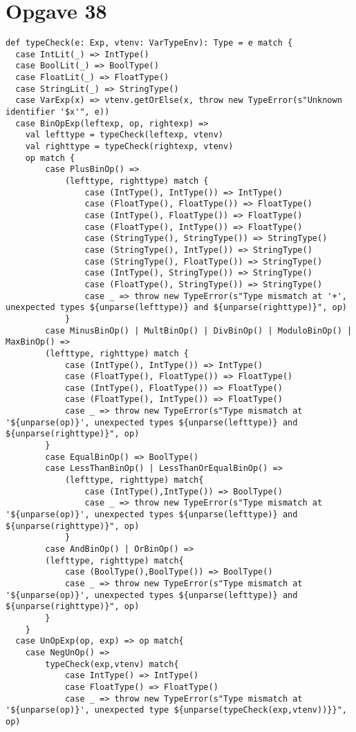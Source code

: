 \documentclass[a4paper, 10pt]{article}
\begin{document}
\section*{Opgave 38}
\begin{lstlisting}
def typeCheck(e: Exp, vtenv: VarTypeEnv): Type = e match {
  case IntLit(_) => IntType()
  case BoolLit(_) => BoolType()
  case FloatLit(_) => FloatType()
  case StringLit(_) => StringType()
  case VarExp(x) => vtenv.getOrElse(x, throw new TypeError(s"Unknown identifier '$x'", e))
  case BinOpExp(leftexp, op, rightexp) =>
  	val lefttype = typeCheck(leftexp, vtenv)
  	val righttype = typeCheck(rightexp, vtenv)
  	op match {
  		case PlusBinOp() =>
  			(lefttype, righttype) match {
  				case (IntType(), IntType()) => IntType()
  				case (FloatType(), FloatType()) => FloatType()
  				case (IntType(), FloatType()) => FloatType()
  				case (FloatType(), IntType()) => FloatType()
  				case (StringType(), StringType()) => StringType()
  				case (StringType(), IntType()) => StringType()
  				case (StringType(), FloatType()) => StringType()
  				case (IntType(), StringType()) => StringType()
  				case (FloatType(), StringType()) => StringType()
  				case _ => throw new TypeError(s"Type mismatch at '+', unexpected types ${unparse(lefttype)} and ${unparse(righttype)}", op)
  			}
  		case MinusBinOp() | MultBinOp() | DivBinOp() | ModuloBinOp() | MaxBinOp() =>
  		(lefttype, righttype) match {
	  		case (IntType(), IntType()) => IntType()
  			case (FloatType(), FloatType()) => FloatType()
  			case (IntType(), FloatType()) => FloatType()
	  		case (FloatType(), IntType()) => FloatType()
  			case _ => throw new TypeError(s"Type mismatch at '${unparse(op)}', unexpected types ${unparse(lefttype)} and ${unparse(righttype)}", op)
  		}
  		case EqualBinOp() => BoolType()
  		case LessThanBinOp() | LessThanOrEqualBinOp() =>
  			(lefttype, righttype) match{
		  		case (IntType(),IntType()) => BoolType()
  				case _ => throw new TypeError(s"Type mismatch at '${unparse(op)}', unexpected types ${unparse(lefttype)} and ${unparse(righttype)}", op)
	  		}
  		case AndBinOp() | OrBinOp() =>
	  	(lefttype, righttype) match{
  			case (BoolType(),BoolType()) => BoolType()
	  		case _ => throw new TypeError(s"Type mismatch at '${unparse(op)}', unexpected types ${unparse(lefttype)} and ${unparse(righttype)}", op)
	  	}
  	}
  case UnOpExp(op, exp) => op match{
  	case NegUnOp() =>
	  	typeCheck(exp,vtenv) match{
			case IntType() => IntType()
  			case FloatType() => FloatType()
	  		case _ => throw new TypeError(s"Type mismatch at '${unparse(op)}', unexpected type ${unparse(typeCheck(exp,vtenv))}}", op)

\end{lstlisting}
\end{document}

